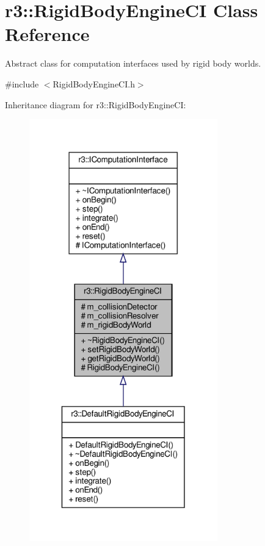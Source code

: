 \hypertarget{classr3_1_1_rigid_body_engine_c_i}{}\section{r3\+:\+:Rigid\+Body\+Engine\+CI Class Reference}
\label{classr3_1_1_rigid_body_engine_c_i}


Abstract class for computation interfaces used by rigid body worlds.  




{\ttfamily \#include $<$Rigid\+Body\+Engine\+C\+I.\+h$>$}



Inheritance diagram for r3\+:\+:Rigid\+Body\+Engine\+CI\+:\nopagebreak
\begin{figure}[H]
\begin{center}
\leavevmode
\includegraphics[width=231pt]{classr3_1_1_rigid_body_engine_c_i__inherit__graph}
\end{center}
\end{figure}


